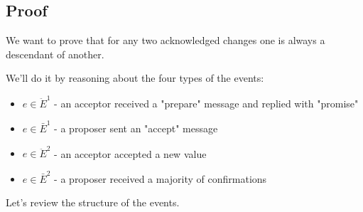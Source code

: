 \documentclass[a4paper,USenglish]{lipics-v2018}
\theoremstyle{definition}
\begin{document}
    \begin{appendices}
        \section{Proof}
        \label{appendix:proof}

        We want to prove that for any two acknowledged changes one is always a descendant of another.
        
        We'll do it by reasoning about the four types of the events:
        
        \begin{itemize}
            \item $e \in \ddot{E}^1$ - an acceptor received a "prepare" message and replied with "promise"
            \item $e \in \bar{E}^1$ - a proposer sent an "accept" message
            \item $e \in \ddot{E}^2$ - an acceptor accepted a new value
            \item $e \in \bar{E}^2$ - a proposer received a majority of confirmations
        \end{itemize}
        
        Let's review the structure of the events.
        

\end{appendices}
\end{document}
